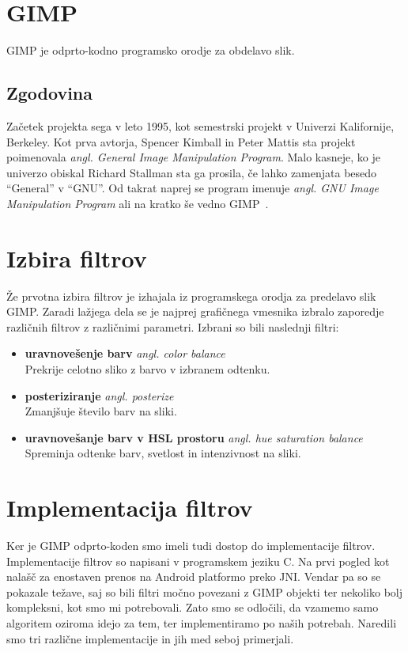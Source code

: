 \section{GIMP}
GIMP je odprto-kodno programsko orodje za obdelavo slik.

\subsection{Zgodovina}
Začetek projekta sega v leto 1995, kot semestrski projekt v Univerzi Kalifornije, Berkeley. Kot prva avtorja, Spencer Kimball in Peter Mattis sta projekt poimenovala \textit{angl. General Image Manipulation Program}. Malo kasneje, ko je univerzo obiskal Richard Stallman sta ga prosila, če lahko zamenjata besedo ``General'' v ``GNU''. Od takrat naprej se program imenuje \textit{angl. GNU Image Manipulation Program} ali na kratko še vedno GIMP~\cite{wiki:GIMP}.

\section{Izbira filtrov}
Že prvotna izbira filtrov je izhajala iz programskega orodja za predelavo slik GIMP. Zaradi lažjega dela se je najprej grafičnega vmesnika izbralo zaporedje različnih filtrov z različnimi parametri. Izbrani so bili naslednji filtri:
\begin{itemize}
	\item \textbf{uravnovešenje barv} \textit{angl. color balance} \hfill \\ Prekrije celotno sliko z barvo v izbranem odtenku.
	\item \textbf{posteriziranje} \textit{angl. posterize} \hfill \\ Zmanjšuje število barv na sliki.
	\item \textbf{uravnovešanje barv v HSL prostoru} \textit{angl. hue saturation balance} \hfill \\ Spreminja odtenke barv, svetlost in intenzivnost na sliki.%
\end{itemize}

\section{Implementacija filtrov}
Ker je GIMP odprto-koden smo imeli tudi dostop do implementacije filtrov. Implementacije filtrov so napisani v programskem jeziku C. Na prvi pogled kot nalašč za enostaven prenos na Android platformo preko JNI. Vendar pa so se pokazale težave, saj so bili filtri močno povezani z GIMP objekti ter nekoliko bolj kompleksni, kot smo mi potrebovali. Zato smo se odločili, da vzamemo samo algoritem oziroma idejo za tem, ter implementiramo po naših potrebah. Naredili smo tri različne implementacije in jih med seboj primerjali.

